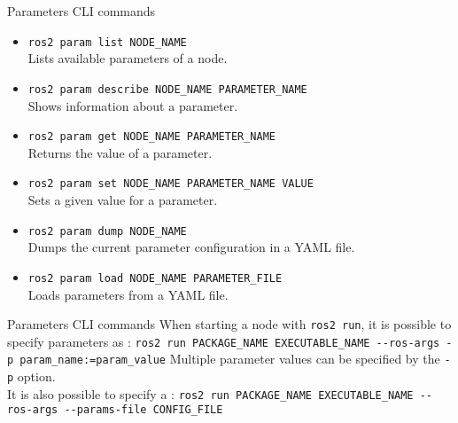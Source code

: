 \begin{frame}{Parameters CLI commands}
	\begin{itemize}
		\item \texttt{ros2 param list NODE\_NAME}\\Lists available parameters of a node.
		\item \texttt{ros2 param describe NODE\_NAME PARAMETER\_NAME}\\Shows information about a parameter.
		\item \texttt{ros2 param get NODE\_NAME PARAMETER\_NAME}\\Returns the value of a parameter.
		\item \texttt{ros2 param set NODE\_NAME PARAMETER\_NAME VALUE}\\Sets a given value for a parameter.
		\item \texttt{ros2 param dump NODE\_NAME}\\Dumps the current parameter configuration in a YAML file.
		\item \texttt{ros2 param load NODE\_NAME PARAMETER\_FILE}\\Loads parameters from a YAML file.
	\end{itemize}
\end{frame}
\begin{frame}{Parameters CLI commands}
  When starting a node with \texttt{ros2 run}, it is possible to specify parameters as :
  \newline\newline
  \texttt{ros2 run PACKAGE\_NAME EXECUTABLE\_NAME -{}-ros-args -p param\_name:=param\_value}
  \newline\newline
  Multiple parameter values can be specified by  the \texttt{-p} option.\\
  It is also possible to specify a :
  \newline\newline
  \texttt{ros2 run PACKAGE\_NAME EXECUTABLE\_NAME -{}-ros-args -{}-params-file CONFIG\_FILE}
\end{frame}

